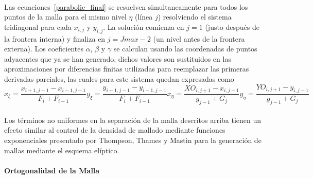 \documentclass[letterpaper, openright, 12pt]{book}
\begin{document}
    \paragraph*{}
    Las ecuaciones~\ref{parabolic_final} se resuelven simultaneamente para
    todos los puntos de la malla para el mismo nivel $\eta$ (línea $j$)
    resolviendo el sistema tridiagonal para cada $x_{i, j}$ y $y_{i, j}$. La
    solución comienza en $j = 1$ (justo después de la frontera interna) y
    finaliza en $j = Jmax - 2$ (un nivel antes de la frontera externa). Los
    coeficientes $\alpha$, $\beta$ y $\gamma$ se calculan usando las
    coordenadas de puntos adyacentes que ya se han generado, dichos valores
    son sustituidos en las aproximaciones por diferencias finitas utilizadas
    para reemplazar las primeras derivadas parciales, las cuales para este
    sistema quedan expresadas como\\
    \begin{subequations}
        \begin{equation}
            x_\xi = \frac{x_{i+1, j-1} - x_{i-1, j-1}}{F_i + F_{i-1}}
        \end{equation}
        \begin{equation}
            y_\xi = \frac{y_{i+1, j-1} - y_{i-1, j-1}}{F_i + F_{i-1}}
        \end{equation}
        \begin{equation}
            x_\eta = \frac{XO_{i, j+1} - x_{i, j-1}}{g_{j-1} + G_j}
        \end{equation}
        \begin{equation}
            y_\eta = \frac{YO_{i, j+1} - y_{i, j-1}}{g_{j-1} + G_j}
        \end{equation}
    \end{subequations}

    \paragraph*{}
    Los términos no uniformes en la separación de la malla descritos arriba
    tienen un efecto similar al control de la densidad de mallado mediante
    funciones exponenciales presentado por Thompson, Thames y Mastin
    \cite{thompson1974automatic} para la generación de mallas mediante el
    esquema elíptico.

    \paragraph*{Ortogonalidad de la Malla}
\end{document}
